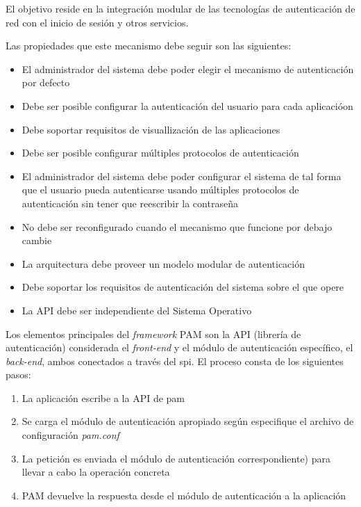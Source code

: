 El objetivo reside en la integración modular de las tecnologías de autenticación de red con el inicio de sesión y otros servicios.

Las propiedades que este mecanismo debe seguir son las siguientes:

\begin{itemize}
    \item El administrador del sistema debe poder elegir el mecanismo de autenticación por defecto
    \item Debe ser posible configurar la autenticación del usuario para cada aplicacióon
    \item Debe soportar requisitos de visuallización de las aplicaciones
    \item Debe ser posible configurar múltiples protocolos de autenticación
    \item El administrador del sistema debe poder configurar el sistema de tal forma que el usuario pueda autenticarse usando 
    múltiples protocolos de autenticación sin tener que reescribir la contraseña
    \item No debe ser reconfigurado cuando el mecanismo que funcione por debajo cambie
    \item La arquitectura debe proveer un modelo modular de autenticación  
    \item Debe soportar los requisitos de autenticación del sistema sobre el que opere 
    \item La API debe ser independiente del Sistema Operativo
\end{itemize}

Los elementos principales del \textit{framework} PAM son la API (librería de autenticación) considerada el \textit{front-end} y 
el módulo de autenticación específico, el \textit{back-end}, ambos conectados a través del \acrfull{spi}.
El proceso consta de los siguientes pasos:

\begin{enumerate}
    \item La aplicación escribe a la API de pam
    \item Se carga el módulo de autenticación apropiado según especifique el archivo de configuración \textit{pam.conf}
    \item La petición es enviada el módulo de autenticación correspondiente) para llevar a cabo la operación concreta
    \item PAM devuelve la respuesta desde el módulo de autenticación a la aplicación
\end{enumerate}

